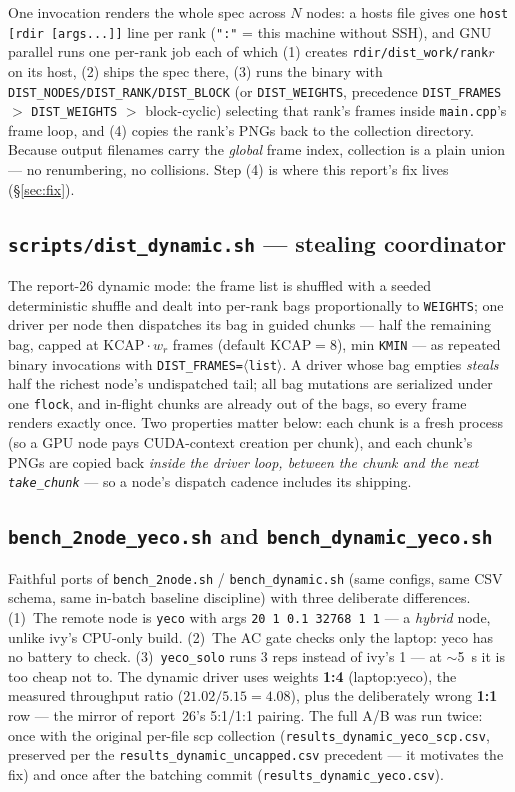 \documentclass[
	english,
	letterpaper, oneside
]{article}
\begin{document}
One invocation renders the whole spec across $N$ nodes: a hosts file
gives one \texttt{host [rdir [args...]]} line per rank (\texttt{":"} =
this machine without SSH), and GNU parallel runs one per-rank job each of
which (1) creates \texttt{rdir/dist\_work/rank$r$} on its host, (2) ships
the spec there, (3) runs the binary with
\texttt{DIST\_NODES/DIST\_RANK/DIST\_BLOCK} (or \texttt{DIST\_WEIGHTS},
precedence \texttt{DIST\_FRAMES} $>$ \texttt{DIST\_WEIGHTS} $>$
block-cyclic) selecting that rank's frames inside \texttt{main.cpp}'s
frame loop, and (4) copies the rank's PNGs back to the collection
directory. Because output filenames carry the \emph{global} frame index,
collection is a plain union --- no renumbering, no collisions. Step (4)
is where this report's fix lives (\S\ref{sec:fix}).

\subsection{\texttt{scripts/dist\_dynamic.sh} --- stealing coordinator}

The report-26 dynamic mode: the frame list is shuffled with a seeded
deterministic shuffle and dealt into per-rank bags proportionally to
\texttt{WEIGHTS}; one driver per node then dispatches its bag in guided
chunks --- half the remaining bag, capped at $\mathrm{KCAP}\cdot w_r$
frames (default $\mathrm{KCAP}=8$), min \texttt{KMIN} --- as repeated
binary invocations with \texttt{DIST\_FRAMES=$\langle$list$\rangle$}. A
driver whose bag empties \emph{steals} half the richest node's
undispatched tail; all bag mutations are serialized under one
\texttt{flock}, and in-flight chunks are already out of the bags, so
every frame renders exactly once. Two properties matter below: each
chunk is a fresh process (so a GPU node pays CUDA-context creation per
chunk), and each chunk's PNGs are copied back \emph{inside the driver
loop, between the chunk and the next \texttt{take\_chunk}} --- so a
node's dispatch cadence includes its shipping.

\subsection{\texttt{bench\_2node\_yeco.sh} and \texttt{bench\_dynamic\_yeco.sh}}

Faithful ports of \texttt{bench\_2node.sh} / \texttt{bench\_dynamic.sh}
(same configs, same CSV schema, same in-batch baseline discipline) with
three deliberate differences. (1)~The remote node is \texttt{yeco} with
args \texttt{20 1 0.1 32768 1 1} --- a \emph{hybrid} node, unlike ivy's
CPU-only build. (2)~The AC gate checks only the laptop: yeco has no
battery to check. (3)~\texttt{yeco\_solo} runs 3 reps instead of ivy's 1
--- at $\sim$5~s it is too cheap not to. The dynamic driver uses weights
\textbf{1:4} (laptop:yeco), the measured throughput ratio
($21.02/5.15 = 4.08$), plus the deliberately wrong \textbf{1:1} row ---
the mirror of report~26's 5:1/1:1 pairing. The full A/B was run twice:
once with the original per-file scp collection
(\texttt{results\_dynamic\_yeco\_scp.csv}, preserved per the
\texttt{results\_dynamic\_uncapped.csv} precedent --- it motivates the
fix) and once after the batching commit
(\texttt{results\_dynamic\_yeco.csv}).
\end{document}
